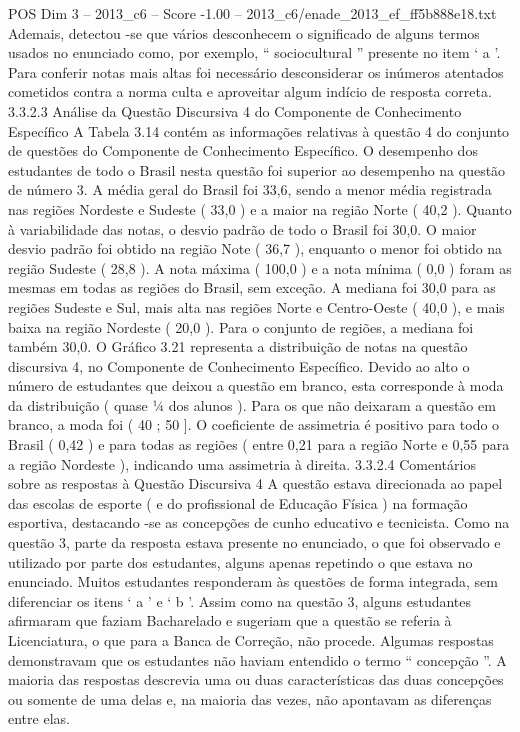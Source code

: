 \begin{textsample}{POS Dim 3 – 2013\_c6 – Score -1.00 – 2013\_c6/enade\_2013\_ef\_ff5b888e18.txt}
Ademais, detectou -se que vários desconhecem o significado de alguns termos usados no enunciado como, por exemplo, “ sociocultural ” presente no item ‘ a ’.
Para conferir notas mais altas foi necessário desconsiderar os inúmeros atentados cometidos contra a norma culta e aproveitar algum indício de resposta correta. 3.3.2.3 Análise da Questão Discursiva 4 do Componente de Conhecimento Específico A Tabela 3.14 contém as informações relativas à questão 4 do conjunto de questões do Componente de Conhecimento Específico.
O desempenho dos estudantes de todo o Brasil nesta questão foi superior ao desempenho na questão de número 3.
A média geral do Brasil foi 33,6, sendo a menor média registrada nas regiões Nordeste e Sudeste ( 33,0 ) e a maior na região Norte ( 40,2 ).
Quanto à variabilidade das notas, o desvio padrão de todo o Brasil foi 30,0.
O maior desvio padrão foi obtido na região Note ( 36,7 ), enquanto o menor foi obtido na região Sudeste ( 28,8 ).
A nota máxima ( 100,0 ) e a nota mínima ( 0,0 ) foram as mesmas em todas as regiões do Brasil, sem exceção.
A mediana foi 30,0 para as regiões Sudeste e Sul, mais alta nas regiões Norte e Centro-Oeste ( 40,0 ), e mais baixa na região Nordeste ( 20,0 ).
Para o conjunto de regiões, a mediana foi também 30,0.
O Gráfico 3.21 representa a distribuição de notas na questão discursiva 4, no Componente de Conhecimento Específico.
Devido ao alto o número de estudantes que deixou a questão em branco, esta corresponde à moda da distribuição ( quase ¼ dos alunos ).
Para os que não deixaram a questão em branco, a moda foi ( 40 ; 50 ].
O coeficiente de assimetria é positivo para todo o Brasil ( 0,42 ) e para todas as regiões ( entre 0,21 para a região Norte e 0,55 para a região Nordeste ), indicando uma assimetria à direita. 3.3.2.4 Comentários sobre as respostas à Questão Discursiva 4 A questão estava direcionada ao papel das escolas de esporte ( e do profissional de Educação Física ) na formação esportiva, destacando -se as concepções de cunho educativo e tecnicista.
Como na questão 3, parte da resposta estava presente no enunciado, o que foi observado e utilizado por parte dos estudantes, alguns apenas repetindo o que estava no enunciado.
Muitos estudantes responderam às questões de forma integrada, sem diferenciar os itens ‘ a ’ e ‘ b ’.
Assim como na questão 3, alguns estudantes afirmaram que faziam Bacharelado e sugeriam que a questão se referia à Licenciatura, o que para a Banca de Correção, não procede.
Algumas respostas demonstravam que os estudantes não haviam entendido o termo “ concepção ”.
A maioria das respostas descrevia uma ou duas características das duas concepções ou somente de uma delas e, na maioria das vezes, não apontavam as diferenças entre elas.

\end{textsample}
